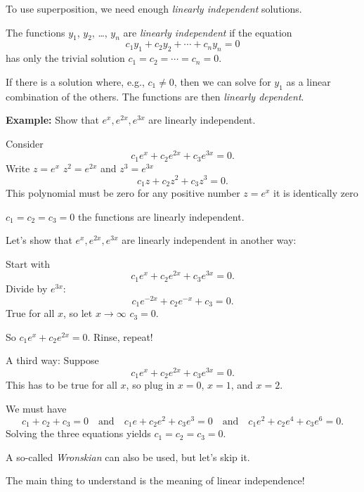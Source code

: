 \documentclass[10pt,aspectratio=169]{beamer}
\begin{document}
\begin{frame}

To use superposition, we need enough \emph{linearly independent} solutions.

\medskip
\pause

The functions $y_1$, $y_2$, \ldots, $y_n$ are \emph{linearly independent} if
the equation
\[
c_1 y_1 + c_2 y_2 + \cdots + c_n y_n = 0 
\]
has only the trivial solution $c_1 = c_2 = \cdots = c_n = 0$.

\medskip
\pause

If there is a solution where, e.g.,
$c_1 \not= 0$, then we
can solve for $y_1$ as a linear combination of the others.
\pause
The functions are then
\emph{linearly dependent}.

\medskip
\pause

\textbf{Example:} Show that $e^x, e^{2x}, e^{3x}$ are linearly independent.

\medskip
\pause

Consider
\[
c_1 e^x + c_2 e^{2x} + c_3 e^{3x} = 0.
\]
\pause
Write $z = e^x$
\pause
\wthus
$z^2 = e^{2x}$ and $z^3 = e^{3x}$ \pause \wthus
\[
c_1 z + c_2 z^2 + c_3 z^3 = 0.
\]
\pause
This polynomial must be zero for any positive number $z=e^{x}$
\pause
\wthus
it is identically zero

\pause
\thus
\quad
$c_1 = c_2 = c_3 = 0$
\pause
\wthus
the functions are linearly independent.
\end{frame}

\begin{frame}

Let's show that $e^x, e^{2x}, e^{3x}$ are linearly independent in another
way:

\medskip
\pause

Start with
\[
c_1 e^x + c_2 e^{2x} + c_3 e^{3x} = 0.
\]
\pause
Divide by $e^{3x}$:
\[
c_1 e^{-2x} + c_2 e^{-x} + c_3 = 0.
\]
\pause
True for all $x$, so let $x \to \infty$
\pause
\wthus $c_3 = 0$.

\medskip
\pause

So $c_1 e^x + c_2 e^{2x} = 0$.
\pause Rinse, repeat!

\medskip
\pause

A third way:  Suppose
\[
c_1 e^x + c_2 e^{2x} + c_3 e^{3x} = 0.
\]
This has to be true for all $x$, so plug in $x=0$, $x=1$, and $x=2$.

\medskip
\pause

We must have
\[
c_1 + c_2 + c_3 = 0
\quad\text{and}\quad
c_1 e + c_2 e^{2} + c_3 e^{3} = 0
\quad\text{and}\quad
c_1 e^2 + c_2 e^{4} + c_3 e^{6} = 0.
\]
\pause
Solving the three equations yields $c_1=c_2=c_3=0$.

\medskip
\pause

A so-called \emph{Wronskian} can also be used, but let's skip it.
\pause

The main thing to understand is the meaning of linear independence!

\end{frame}
\end{document}
